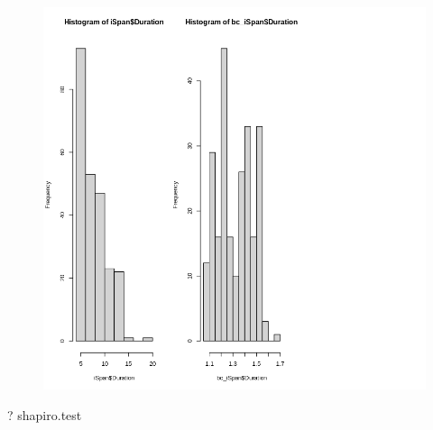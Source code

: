\documentclass[
  letterpaper,
  DIV=11,
  numbers=noendperiod]{scrartcl}
\newenvironment{Shaded}{\begin{snugshade}}{\end{snugshade}}
\newcommand{\NormalTok}[1]{\textcolor[rgb]{0.00,0.23,0.31}{#1}}
\begin{document}
\begin{figure}[H]

{\centering \includegraphics{dss-span-analysis-rev5_files/figure-pdf/cell-67-output-1.png}

}

\end{figure}

\begin{Shaded}
\begin{Highlighting}[]
\NormalTok{? shapiro.test}
\end{Highlighting}
\end{Shaded}
\end{document}
